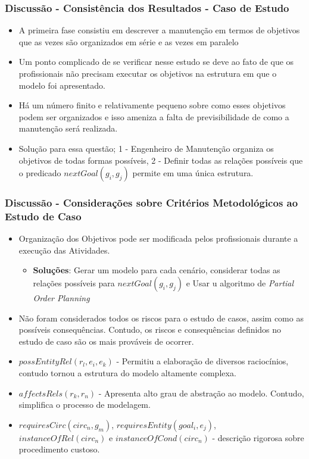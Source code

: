 \documentclass{beamer}
\begin{document}
\begin{frame}
	\frametitle{Discussão - Consistência dos Resultados - Caso de Estudo}
	\begin{itemize}
		\item A primeira fase consistiu em descrever a manutenção em termos de objetivos que as vezes são organizados em série e as vezes em paralelo
		\item Um ponto  complicado de se verificar nesse estudo se deve ao fato de que os profissionais não precisam executar os objetivos na estrutura em que o modelo foi apresentado.
		\item Há um número finito e relativamente pequeno sobre como esses objetivos podem ser organizados e isso ameniza a falta de previsibilidade de como a manutenção será realizada.
		\item Solução para essa questão; 1 - Engenheiro de Manutenção organiza os objetivos de todas formas possíveis, 2 - Definir todas as relações possíveis que o predicado $nextGoal(g_i,g_j)$ permite em uma única estrutura.
	\end{itemize}
\end{frame}


\begin{frame}
	\frametitle{Discussão - Considerações sobre Critérios Metodológicos ao Estudo de Caso}
	\begin{itemize}
		\item Organização dos Objetivos pode ser modificada pelos profissionais durante a execução das Atividades.
		\begin{itemize}
			\item \textbf{Soluções}: Gerar um modelo para cada cenário, considerar todas as relações possíveis para $nextGoal(g_i,g_j)$ e Usar u algoritmo de \textit{Partial Order Planning}
		\end{itemize}
		\item Não foram considerados todos os riscos para o estudo de casos, assim como as possíveis consequências. Contudo, os riscos e consequências definidos no estudo de caso são os mais prováveis de ocorrer.
		\item $possEntityRel(r_l,e_i,e_k)$ - Permitiu a elaboração de diversos raciocínios, contudo tornou a estrutura do modelo altamente complexa.
		\item $affectsRels(r_k,r_n)$ - Apresenta alto grau de abstração ao modelo. Contudo, simplifica o processo de modelagem.
		\item $requiresCirc(circ_n,g_m)$, $requiresEntity(goal_i, e_j)$, $instanceOfRel(circ_n)$ e $instanceOfCond(circ_n)$ - descrição rigorosa sobre procedimento custoso. 
	\end{itemize}
\end{frame}
\end{document}
